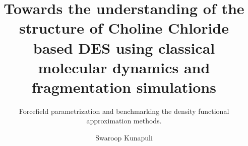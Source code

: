 \documentclass{customformat}
\begin{document}
\author{Swaroop Kunapuli}
\title{Towards the understanding of the structure of Choline Chloride based DES using classical molecular dynamics and fragmentation simulations}
\subtitle{Forcefield parametrization and benchmarking the density functional approximation methods.}

\maketitle
\newpage
\tableofcontents
\newpage



\end{document}
